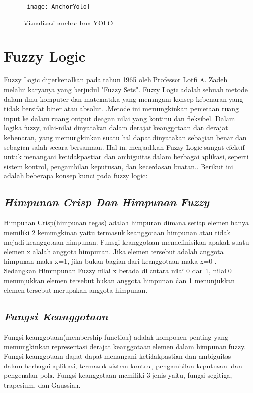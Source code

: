 \begin{figure}[H]
	\centering
	\texttt{[image: AnchorYolo]}
	\caption{Visualisasi anchor box YOLO}
	\label{fig:anchor}
\end{figure}

\section{Fuzzy Logic}
Fuzzy Logic diperkenalkan pada tahun 1965 oleh Professor Lotfi A. Zadeh melalui karyanya yang berjudul "Fuzzy Sets". Fuzzy Logic adalah sebuah metode dalam ilmu komputer dan matematika yang menangani konsep kebenaran yang tidak bersifat biner atau absolut.  \cite{kambalimath2020basic}.Metode ini memungkinkan pemetaan ruang input ke dalam ruang output dengan nilai yang kontinu dan fleksibel. Dalam logika fuzzy, nilai-nilai dinyatakan dalam derajat keanggotaan dan derajat kebenaran, yang memungkinkan suatu hal dapat dinyatakan sebagian benar dan sebagian salah secara bersamaan. Hal ini menjadikan Fuzzy Logic sangat efektif untuk menangani ketidakpastian dan ambiguitas dalam berbagai aplikasi, seperti sistem kontrol, pengambilan keputusan, dan kecerdasan buatan.\cite{sri2003artificial}. Berikut ini adalah beberapa konsep kunci pada fuzzy logic:
\subsection{\textit{Himpunan Crisp Dan Himpunan Fuzzy}}
Himpunan Crisp(himpunan tegas) adalah himpunan dimana setiap elemen hanya memiliki 2 kemungkinan yaitu termasuk keanggotaan himpunan atau tidak mejadi keanggotaan himpunan. Funsgi keanggotaan mendefinisikan apakah suatu elemen x alalah anggota himpunan. Jika elemen tersebut adalah anggota himpunan maka x=1, jika bukan bagian dari keanggotaan maka x=0 \cite{rindengan2019sistem}. Sedangkan Himmpunan Fuzzy nilai x berada di antara nilai 0 dan 1, nilai 0 menunjukkan elemen tersebut bukan anggota himpunan dan 1 menunjukkan elemen tersebut merupakan anggota himpunan. 
\subsection{\textit{Fungsi Keanggotaan}}
Fungsi keanggotaan(membership function) adalah komponen penting yang memungkinkan representasi derajat keanggotaan elemen dalam himpunan fuzzy. Fungsi keanggotaan dapat dapat menangani  ketidakpastian dan ambiguitas dalam berbagai aplikasi, termasuk sistem kontrol, pengambilan keputusan, dan pengenalan pola. Fungsi keanggotaan memiliki 3 jenis yaitu, fungsi segitiga, trapesium, dan Gaussian.
